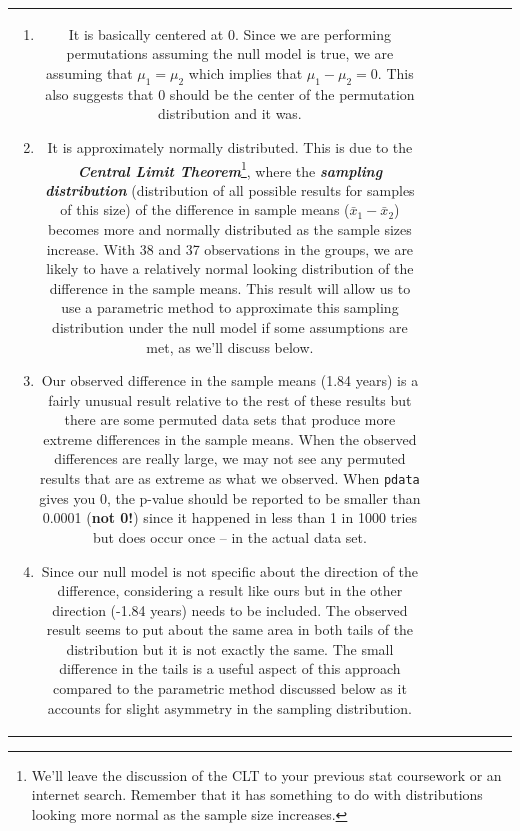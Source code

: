 \documentclass[]{book}
\let\rmarkdownfootnote\footnote%
\def\footnote{\protect\rmarkdownfootnote}
\theoremstyle{definition}
\theoremstyle{definition}
\theoremstyle{remark}
\begin{document}
\begin{longtable}[]{@{}ccccccc@{}}
\begin{minipage}[b]{0.10\columnwidth}
\begin{enumerate}
\def\labelenumi{\arabic{enumi}.}
\item
  It is basically centered at 0. Since we are performing permutations
  assuming the null model is true, we are assuming that
  \(\mu_1 = \mu_2\) which implies that \(\mu_1 - \mu_2 = 0\). This also
  suggests that 0 should be the center of the permutation distribution
  and it was.
\item
  It is approximately normally distributed. This is due to the
  \textbf{\emph{Central Limit Theorem}}\footnote{We'll leave the
    discussion of the CLT to your previous stat coursework or an
    internet search. Remember that it has something to do with
    distributions looking more normal as the sample size increases.},
  where the \textbf{\emph{sampling distribution}} (distribution of all
  possible results for samples of this size) of the difference in sample
  means (\(\bar{x}_1 - \bar{x}_2\)) becomes more and normally
  distributed as the sample sizes increase. With 38 and 37 observations
  in the groups, we are likely to have a relatively normal looking
  distribution of the difference in the sample means. This result will
  allow us to use a parametric method to approximate this sampling
  distribution under the null model if some assumptions are met, as
  we'll discuss below.
\item
  Our observed difference in the sample means (1.84 years) is a fairly
  unusual result relative to the rest of these results but there are
  some permuted data sets that produce more extreme differences in the
  sample means. When the observed differences are really large, we may
  not see any permuted results that are as extreme as what we observed.
  When \texttt{pdata} gives you 0, the p-value should be reported to be
  smaller than 0.0001 (\textbf{not 0!}) since it happened in less than 1
  in 1000 tries but does occur once -- in the actual data set.
\item
  Since our null model is not specific about the direction of the
  difference, considering a result like ours but in the other direction
  (-1.84 years) needs to be included. The observed result seems to put
  about the same area in both tails of the distribution but it is not
  exactly the same. The small difference in the tails is a useful aspect
  of this approach compared to the parametric method discussed below as
  it accounts for slight asymmetry in the sampling distribution.
\end{enumerate}


\end{minipage}
\end{longtable}
\end{document}
